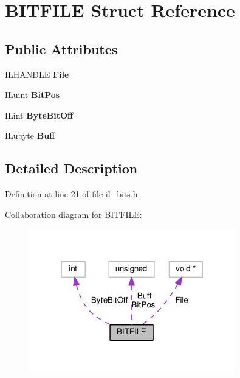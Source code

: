 \hypertarget{structBITFILE}{}\section{B\+I\+T\+F\+I\+LE Struct Reference}
\label{structBITFILE}
\subsection*{Public Attributes}
\begin{DoxyCompactItemize}
\item 
\mbox{\label{structBITFILE_a1fa6dc6b186d0f56cb13b0f3d4398094}} 
I\+L\+H\+A\+N\+D\+LE {\bfseries File}
\item 
\mbox{\label{structBITFILE_a6cac61ce93cbb4d5d9e1aebf455cd090}} 
I\+Luint {\bfseries Bit\+Pos}
\item 
\mbox{\label{structBITFILE_abdffeee109e31f84bd96430b474cefc6}} 
I\+Lint {\bfseries Byte\+Bit\+Off}
\item 
\mbox{\label{structBITFILE_a3fe6dadeedb8d444bbdca796f6ec4bf5}} 
I\+Lubyte {\bfseries Buff}
\end{DoxyCompactItemize}


\subsection{Detailed Description}


Definition at line 21 of file il\+\_\+bits.\+h.



Collaboration diagram for B\+I\+T\+F\+I\+LE\+:
\nopagebreak
\begin{figure}[H]
\begin{center}
\leavevmode
\includegraphics[width=254pt]{d8/d8b/structBITFILE__coll__graph}
\end{center}
\end{figure}


